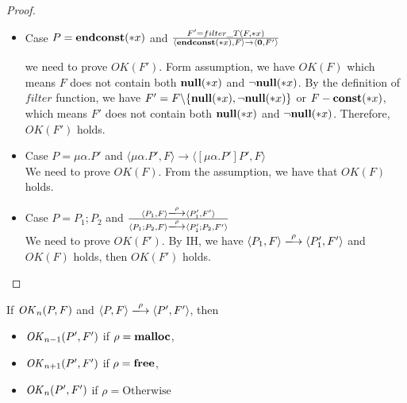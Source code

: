\begin{proof}
\begin{itemize}
    \item Case \( P = \mathbf{endconst}(*x)\) and \(\frac{F' = filter\_T(F, *x)} {
      \langle \mathbf{endconst}(*x), F \rangle \rightarrow \langle {\bf 0}, F'
      \rangle } \) 

      we need to prove \(OK(F')\). Form assumption, we have \(OK(F)\)
      which means \(F\) does not contain both \({\bf null}(*x)\) and
      \(\neg{\bf null}(*x)\). By the definition of \(filter\) function, we have
      \(F' = F\backslash\{{\bf null}(*x),\neg{\bf null}(*x)\}\) or \(F-\mathbf{const}(*x)\),
      which means \(F'\) does not contain both \({\bf null}(*x)\) and
      \(\neg{\bf null}(*x)\). Therefore, \(OK(F')\) holds.

    \item Case \( P = \mu\alpha.P'\) and \( \langle \mu\alpha.P', F \rangle
      \rightarrow \langle [\mu\alpha.P']P', F \rangle \) \\
      We need to prove \( OK(F)\). From the assumption, we have that
      \(OK(F)\) holds.

      


    \item Case \( P = P_1;P_2\) and \( \frac{ \langle P_1, F \rangle \xlongrightarrow{\rho} \langle P_1', F' \rangle }
      {\langle P_1;P_2, F \rangle \xlongrightarrow{\rho} \langle P_1';P_2, F' \rangle} \) \\
    We need to prove \(OK(F')\). By IH, we have \( \langle P_1, F
    \rangle \xlongrightarrow{\rho} \langle P_1', F' \rangle \) and \(
    OK(F) \) holds, then \(OK(F')\) holds.
      
  \end{itemize}
\end{proof}


\begin{lemma}
\label{lem:okPreserved}
If \(\mathit{OK}_n(P, F)\) and \( \langle P, F \rangle \xlongrightarrow{\rho} \langle P', F' \rangle\), then
\begin{itemize}
\item \(\mathit{OK}_{n-1}(P', F')\) if \(\rho = \mathbf{malloc}\),
\item \(\mathit{OK}_{n+1}(P', F')\) if \(\rho = \mathbf{free}\),
\item \(\mathit{OK}_n(P', F')\) if \(\rho = \mbox{Otherwise}  \)
\end{itemize}
\end{lemma}

